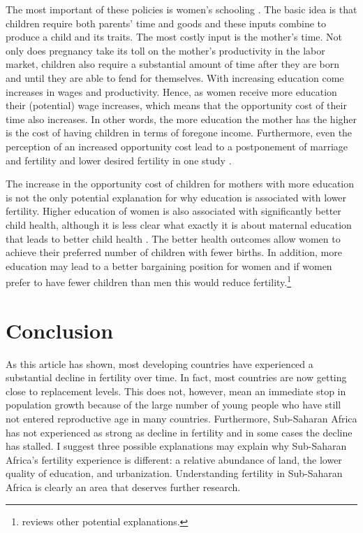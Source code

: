 The most important of these policies is women's schooling \citep{schultz02}. The basic idea is that children require both parents' time and goods and these inputs combine to produce a child and its traits. The most costly input is the mother's time. Not only does pregnancy take its toll on the mother's productivity in the labor market, children also require a substantial amount of time after they are born and until they are able to fend for themselves. With increasing education come increases in wages and productivity. Hence, as women receive more education their (potential) wage increases, which means that the opportunity cost of their time also increases. In other words, the more education the mother has the higher is the cost of having children in terms of foregone income. Furthermore, even the perception of an increased opportunity cost lead to a postponement of marriage and fertility and lower desired fertility in one study \citep{Jensen2012}.

The increase in the opportunity cost of children for mothers with more education is not the only potential explanation for why education is associated with lower fertility. Higher education of women is also associated with significantly better child health, although it is less clear what exactly it is about maternal education that leads to better child health \citep{Thomas1991,Glewwe1999,Kovsted2002}. The better health outcomes allow women to achieve their preferred number of children with fewer births. In addition, more education may lead to a better bargaining position for women and if women prefer to have fewer children than men this would reduce fertility.\footnote{\citet{Ainsworth1996} reviews other potential explanations.}

\section{Conclusion}\label{conclusion}

As this article has shown, most developing countries have experienced a substantial decline in fertility over time. In fact, most countries are now getting close to replacement levels. This does not, however, mean an immediate stop in population growth because of the large number of young people who have still not entered reproductive age in many countries. Furthermore, Sub-Saharan Africa has not experienced as strong as decline in fertility and in some cases the decline has stalled. I suggest three possible explanations may explain why Sub-Saharan Africa's fertility experience is different: a relative abundance of land, the lower quality of education, and urbanization. Understanding fertility in Sub-Saharan Africa is clearly an area that deserves further research.

